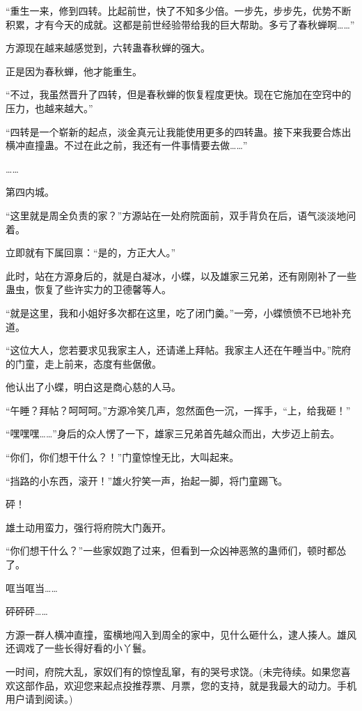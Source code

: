 \begin{this_body}
“重生一来，修到四转。比起前世，快了不知多少倍。一步先，步步先，优势不断积累，才有今天的成就。这都是前世经验带给我的巨大帮助。多亏了春秋蝉啊……”

方源现在越来越感觉到，六转蛊春秋蝉的强大。

正是因为春秋蝉，他才能重生。

“不过，我虽然晋升了四转，但是春秋蝉的恢复程度更快。现在它施加在空窍中的压力，也越来越大。”

“四转是一个崭新的起点，淡金真元让我能使用更多的四转蛊。接下来我要合炼出横冲直撞蛊。不过在此之前，我还有一件事情要去做……”

……

第四内城。

“这里就是周全负责的家？”方源站在一处府院面前，双手背负在后，语气淡淡地问着。

立即就有下属回禀：“是的，方正大人。”

此时，站在方源身后的，就是白凝冰，小蝶，以及雄家三兄弟，还有刚刚补了一些蛊虫，恢复了些许实力的卫德馨等人。

“就是这里，我和小姐好多次都在这里，吃了闭门羹。”一旁，小蝶愤愤不已地补充道。

“这位大人，您若要求见我家主人，还请递上拜帖。我家主人还在午睡当中。”院府的门童，走上前来，态度有些倨傲。

他认出了小蝶，明白这是商心慈的人马。

“午睡？拜帖？呵呵呵。”方源冷笑几声，忽然面色一沉，一挥手，“上，给我砸！”

“嘿嘿嘿……”身后的众人愣了一下，雄家三兄弟首先越众而出，大步迈上前去。

“你们，你们想干什么？！”门童惊惶无比，大叫起来。

“挡路的小东西，滚开！”雄火狞笑一声，抬起一脚，将门童踢飞。

砰！

雄土动用蛮力，强行将府院大门轰开。

“你们想干什么？”一些家奴跑了过来，但看到一众凶神恶煞的蛊师们，顿时都怂了。

哐当哐当……

砰砰砰……

方源一群人横冲直撞，蛮横地闯入到周全的家中，见什么砸什么，逮人揍人。雄风还调戏了一些长得好看的小丫鬟。

一时间，府院大乱，家奴们有的惊惶乱窜，有的哭号求饶。(未完待续。如果您喜欢这部作品，欢迎您来起点投推荐票、月票，您的支持，就是我最大的动力。手机用户请到阅读。)

\end{this_body}

